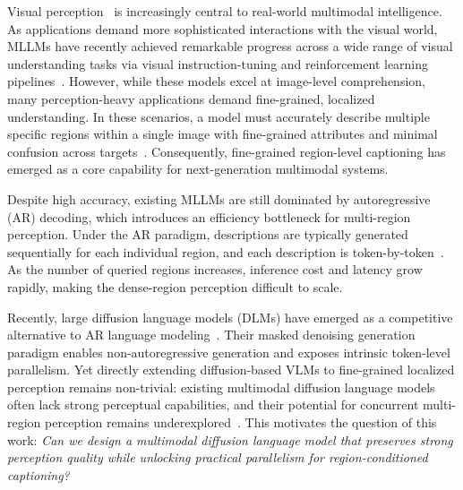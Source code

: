 \documentclass{llmxive}
\begin{document}
    

Visual perception~\citep{lin2014microsoft} is increasingly central to real-world multimodal intelligence. 
%
As applications demand more sophisticated interactions with the visual world, MLLMs have recently achieved remarkable progress across a wide range of visual understanding tasks via visual instruction-tuning and reinforcement learning pipelines~\citep{liu2023visual, li2025llava, an2025llava, bai2025qwen3, wang2025ross3d, zhu2025internvl3, lei2025scalability, meng2025open}.
%
However, while these models excel at image-level comprehension, many perception-heavy applications demand fine-grained, localized understanding. 
%
In these scenarios, a model must accurately describe multiple specific regions within a single image with fine-grained attributes and minimal confusion across targets~\citep{rasheed2024glamm, lian2025describe, wang2025grasp}. 
%
Consequently, fine-grained region-level captioning has emerged as a core capability for next-generation multimodal systems.

Despite high accuracy, existing MLLMs are still dominated by autoregressive (AR) decoding, which introduces an efficiency bottleneck for multi-region perception. 
%
Under the AR paradigm, descriptions are typically generated sequentially for each individual region, and each description is token-by-token~\citep{lian2025describe, wang2025grasp}. 
%
As the number of queried regions increases, inference cost and latency grow rapidly, making the dense-region perception difficult to scale.

Recently, large diffusion language models (DLMs) have emerged as a competitive alternative to AR language modeling~\citep{nielarge, you2025llada, ye2025dream, yangmmada}. Their masked denoising generation paradigm enables non-autoregressive generation and exposes intrinsic token-level parallelism. 
%
Yet directly extending diffusion-based VLMs to fine-grained localized perception remains non-trivial: existing multimodal diffusion language models often lack strong perceptual capabilities, and their potential for concurrent multi-region perception remains underexplored~\citep{you2025llada, cheng2025sdar, ye2025dream, yangmmada}. 
%
This motivates the question of this work: \textit{Can we design a multimodal diffusion language model that preserves strong perception quality while unlocking practical parallelism for region-conditioned captioning?}
\end{document}
